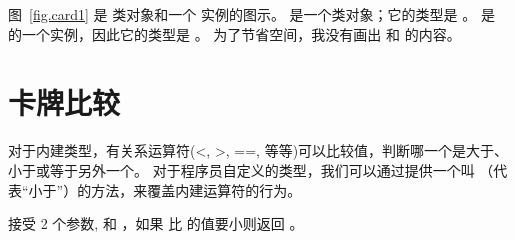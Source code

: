 
图~\ref{fig.card1} 是  类对象和一个  实例的图示。  是一个类对象；它的类型是  。  是  的一个实例，因此它的类型是 。 为了节省空间，我没有画出  和  的内容。

    
  


\section{卡牌比较}

\label{comparecard}


对于内建类型，有关系运算符(<, >, ==, 等等)可以比较值，判断哪一个是大于、小于或等于另外一个。
对于程序员自定义的类型，我们可以通过提供一个叫  （代表“小于”）的方法，来覆盖内建运算符的行为。



 接受 2 个参数,  和 ，如果  比  的值要小则返回  。



